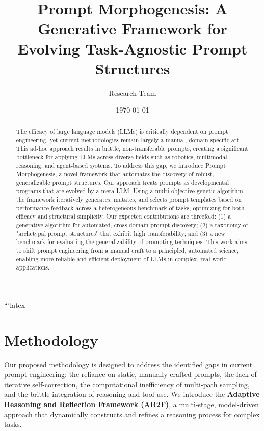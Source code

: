 \documentclass{article}
\begin{document}
\title{Prompt Morphogenesis: A Generative Framework for Evolving Task-Agnostic Prompt Structures}
\author{Research Team}
\date{\today}

\begin{abstract}
The efficacy of large language models (LLMs) is critically dependent on prompt engineering, yet current methodologies remain largely a manual, domain-specific art. This ad-hoc approach results in brittle, non-transferable prompts, creating a significant bottleneck for applying LLMs across diverse fields such as robotics, multimodal reasoning, and agent-based systems. To address this gap, we introduce Prompt Morphogenesis, a novel framework that automates the discovery of robust, generalizable prompt structures. Our approach treats prompts as developmental programs that are evolved by a meta-LLM. Using a multi-objective genetic algorithm, the framework iteratively generates, mutates, and selects prompt templates based on performance feedback across a heterogeneous benchmark of tasks, optimizing for both efficacy and structural simplicity. Our expected contributions are threefold: (1) a generative algorithm for automated, cross-domain prompt discovery; (2) a taxonomy of "archetypal prompt structures" that exhibit high transferability; and (3) a new benchmark for evaluating the generalizability of prompting techniques. This work aims to shift prompt engineering from a manual craft to a principled, automated science, enabling more reliable and efficient deployment of LLMs in complex, real-world applications.
\end{abstract}

\maketitle



```latex
\section{Methodology}
\label{sec:methodology}

Our proposed methodology is designed to address the identified gaps in current prompt engineering: the reliance on static, manually-crafted prompts, the lack of iterative self-correction, the computational inefficiency of multi-path sampling, and the brittle integration of reasoning and tool use. We introduce the \textbf{Adaptive Reasoning and Reflection Framework (AR2F)}, a multi-stage, model-driven approach that dynamically constructs and refines a reasoning process for complex tasks.
\end{document}
